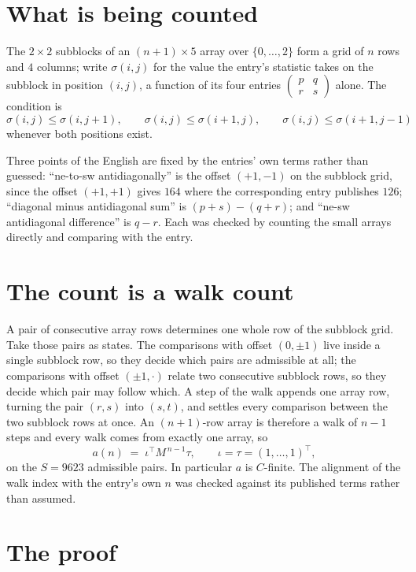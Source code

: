 \documentclass[11pt,a4paper]{article}
\theoremstyle{plain}
\theoremstyle{definition}
\begin{document}
\section{What is being counted}

The $2\times2$ subblocks of an $(n+1)\times5$ array over $\{0,\dots,2\}$ form a grid
of $n$ rows and $4$ columns; write $\sigma(i,j)$ for the value the entry's statistic takes on
the subblock in position $(i,j)$, a function of its four entries
$\begin{pmatrix}p&q\\r&s\end{pmatrix}$ alone. The condition is
\[
\sigma(i,j)\le\sigma(i,j+1),\qquad \sigma(i,j)\le\sigma(i+1,j),\qquad \sigma(i,j)\le\sigma(i+1,j-1)
\]
whenever both positions exist.

Three points of the English are fixed by the entries' own terms rather than guessed:
``ne-to-sw antidiagonally'' is the offset $(+1,-1)$ on the subblock grid, since the offset
$(+1,+1)$ gives $164$ where the corresponding entry publishes $126$; ``diagonal minus
antidiagonal sum'' is $(p+s)-(q+r)$; and ``ne-sw antidiagonal difference'' is $q-r$. Each was
checked by counting the small arrays directly and comparing with the entry.

\section{The count is a walk count}

A pair of consecutive array rows determines one whole row of the subblock grid. Take those
pairs as states. The comparisons with offset $(0,\pm1)$ live inside a single subblock row, so
they decide which pairs are admissible at all; the comparisons with offset $(\pm1,\cdot)$
relate two consecutive subblock rows, so they decide which pair may follow which. A step of the
walk appends one array row, turning the pair $(r,s)$ into $(s,t)$, and settles every comparison
between the two subblock rows at once. An $(n+1)$-row array is therefore a walk of $n-1$ steps
and every walk comes from exactly one array, so
\[
a(n)\;=\;\iota^{\!\top}M^{\,n-1}\tau,\qquad \iota=\tau=(1,\dots,1)^{\!\top},
\]
on the $S=9623$ admissible pairs. In particular $a$ is $C$-finite. The alignment of the walk
index with the entry's own $n$ was checked against its published terms rather than assumed.

\section{The proof}
\end{document}
